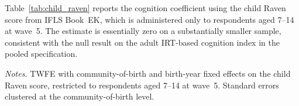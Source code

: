 Table~\ref{tab:child_raven} reports the cognition coefficient using the child Raven score from IFLS Book~EK, which is administered only to respondents aged 7--14 at wave~5. The estimate is essentially zero on a substantially smaller sample, consistent with the null result on the adult IRT-based cognition index in the pooled specification.

\begin{table}[!htbp] \centering \caption{Alternative cognition outcome (child Raven).} \label{tab:child_raven}  \begin{minipage}{0.85\textwidth} \footnotesize \emph{Notes.} TWFE with community-of-birth and birth-year fixed effects on the child Raven score, restricted to respondents aged 7--14 at wave~5. Standard errors clustered at the community-of-birth level. \end{minipage} \end{table}
